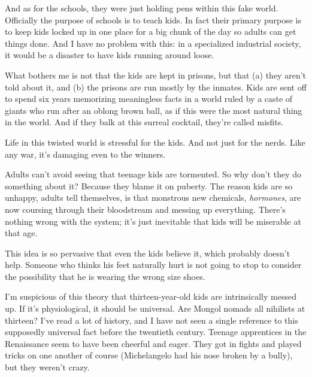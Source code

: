 And as for the schools,
                  they were just holding pens within this fake world. Officially
                  the purpose of schools is to teach kids. In fact their primary
                  purpose is to keep kids locked up in one place for a big chunk
                  of the day so adults can get things done. And I have no
                  problem with this: in a specialized industrial society, it
                  would be a disaster to have kids running around loose.

What
                  bothers me is not that the kids are kept in prisons, but that
                  (a) they aren't told about it, and (b) the prisons are run
                  mostly by the inmates. Kids are sent off to spend six years
                  memorizing meaningless facts in a world ruled by a caste of
                  giants who run after an oblong brown ball, as if this were the
                  most natural thing in the world. And if they balk at this
                  surreal cocktail, they're called misfits.




                  Life in this twisted world is stressful for the kids. And not
                  just for the nerds. Like any war, it's damaging even to the
                  winners.

Adults can't avoid seeing that teenage
                  kids are tormented. So why don't they do something about it?
                  Because they blame it on puberty. The reason kids are so
                  unhappy, adults tell themselves, is that monstrous new
                  chemicals, \emph{hormones}, are now coursing through their
                  bloodstream and messing up everything. There's nothing wrong
                  with the system; it's just inevitable that kids will be
                  miserable at that age.

This idea is so pervasive
                  that even the kids believe it, which probably doesn't help.
                  Someone who thinks his feet naturally hurt is not going to
                  stop to consider the possibility that he is wearing the wrong
                  size shoes.

I'm suspicious of this theory that
                  thirteen-year-old kids are intrinsically messed up. If it's
                  physiological, it should be universal. Are Mongol nomads all
                  nihilists at thirteen? I've read a lot of history, and I have
                  not seen a single reference to this supposedly universal fact
                  before the twentieth century. Teenage apprentices in the
                  Renaissance seem to have been cheerful and eager. They got in
                  fights and played tricks on one another of course
                  (Michelangelo had his nose broken by a bully), but they
                  weren't crazy.

